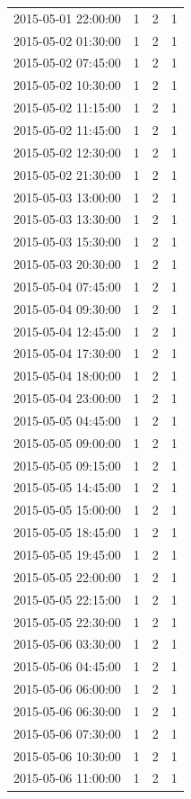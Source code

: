 \begin{tabular}{lrrr}
2015-05-01 22:00:00 & 1 & 2 & 1 \\
2015-05-02 01:30:00 & 1 & 2 & 1 \\
2015-05-02 07:45:00 & 1 & 2 & 1 \\
2015-05-02 10:30:00 & 1 & 2 & 1 \\
2015-05-02 11:15:00 & 1 & 2 & 1 \\
2015-05-02 11:45:00 & 1 & 2 & 1 \\
2015-05-02 12:30:00 & 1 & 2 & 1 \\
2015-05-02 21:30:00 & 1 & 2 & 1 \\
2015-05-03 13:00:00 & 1 & 2 & 1 \\
2015-05-03 13:30:00 & 1 & 2 & 1 \\
2015-05-03 15:30:00 & 1 & 2 & 1 \\
2015-05-03 20:30:00 & 1 & 2 & 1 \\
2015-05-04 07:45:00 & 1 & 2 & 1 \\
2015-05-04 09:30:00 & 1 & 2 & 1 \\
2015-05-04 12:45:00 & 1 & 2 & 1 \\
2015-05-04 17:30:00 & 1 & 2 & 1 \\
2015-05-04 18:00:00 & 1 & 2 & 1 \\
2015-05-04 23:00:00 & 1 & 2 & 1 \\
2015-05-05 04:45:00 & 1 & 2 & 1 \\
2015-05-05 09:00:00 & 1 & 2 & 1 \\
2015-05-05 09:15:00 & 1 & 2 & 1 \\
2015-05-05 14:45:00 & 1 & 2 & 1 \\
2015-05-05 15:00:00 & 1 & 2 & 1 \\
2015-05-05 18:45:00 & 1 & 2 & 1 \\
2015-05-05 19:45:00 & 1 & 2 & 1 \\
2015-05-05 22:00:00 & 1 & 2 & 1 \\
2015-05-05 22:15:00 & 1 & 2 & 1 \\
2015-05-05 22:30:00 & 1 & 2 & 1 \\
2015-05-06 03:30:00 & 1 & 2 & 1 \\
2015-05-06 04:45:00 & 1 & 2 & 1 \\
2015-05-06 06:00:00 & 1 & 2 & 1 \\
2015-05-06 06:30:00 & 1 & 2 & 1 \\
2015-05-06 07:30:00 & 1 & 2 & 1 \\
2015-05-06 10:30:00 & 1 & 2 & 1 \\
2015-05-06 11:00:00 & 1 & 2 & 1 \\

\end{tabular}
